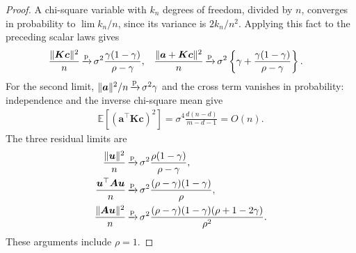 \documentclass{article}
\theoremstyle{plain}
\theoremstyle{definition}
\theoremstyle{definition}
\DeclarePairedDelimiter\norm{\lVert}{\rVert}
\newcommand{\limp}{{\,\smash{\xrightarrow{\mathrm{p}}}}\,}
\def\E{{\mathbb{E}}}
\def\mathbold{\boldsymbol}
\def\cal{\mathcal}
\def\ba{\mathbold{a}}\def\bfa{\mathbold{a}}\def\ahat{\widehat{a}}\def\atil{\widetilde{a}}
\def\bA{\mathbold{A}}\def\calA{{\cal A}}\def\scrA{{\mathscr A}}\def\Ahat{\widehat{A}}\def\Atil{{\widetilde A}}
\def\bc{\mathbold{c}}\def\chat{\widehat{c}}\def\ctil{\widetilde{c}}
\def\bK{\mathbold{K}}\def\hbK{{\widehat{\bK}}}\def\tbK{{\widetilde{\bK}}}
\def\bu{\mathbold{u}}\def\uhat{\widehat{u}}\def\util{\widetilde{u}}\def\ubar{{\overline u}}
\begin{document}
\begin{proof}
A chi-square variable with $k_n$ degrees of freedom, divided by $n$,
converges in probability to $\lim k_n/n$, since its variance is $2k_n/n^2$.
Applying this fact to the preceding scalar laws gives
\begin{align}
    \frac{\norm{\bK\bc}^2}{n}
       &\limp\sigma^2\frac{\gamma(1-\gamma)}{\rho-\gamma},
    &
    \frac{\norm{\ba+\bK\bc}^2}{n}
       &\limp\sigma^2\left\{\gamma+
              \frac{\gamma(1-\gamma)}{\rho-\gamma}\right\}.
    \label{eq:Gaussian-K-traces}
\end{align}
For the second limit, $\norm{\ba}^2/n\limp\sigma^2\gamma$ and the
cross term vanishes in probability: independence and the inverse
chi-square mean give
\begin{align*}
    \E[(\ba^\top\bK\bc)^2]
       =\sigma^4\frac{d(n-d)}{m-d-1}=O(n).
\end{align*}
The three residual limits are
\begin{align}
    \frac{\norm{\bu}^2}{n}
    &\limp \sigma^2\frac{\rho(1-\gamma)}{\rho-\gamma},
    \label{eq:Gaussian-u-limit}\\
    \frac{\bu^\top\bA\bu}{n}
    &\limp \sigma^2\frac{(\rho-\gamma)(1-\gamma)}{\rho},\notag\\
    \frac{\norm{\bA\bu}^2}{n}
    &\limp \sigma^2\frac{(\rho-\gamma)(1-\gamma)(\rho+1-2\gamma)}{\rho^2}.
    \notag
\end{align}
These arguments include $\rho=1$.


\end{proof}
\end{document}
